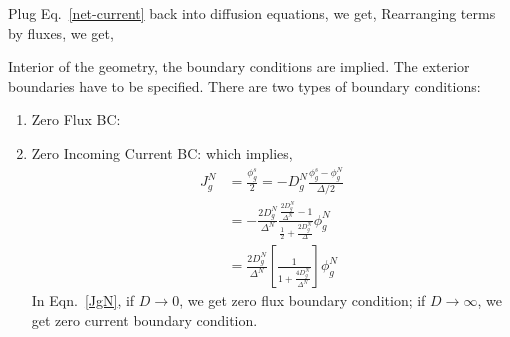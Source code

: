 \documentclass{school-22.211-notes}
\begin{document}
Plug Eq.~\ref{net-current} back into diffusion equations, we get, 
Rearranging terms by fluxes, we get, 

Interior of the geometry, the boundary conditions are implied. The exterior boundaries have to be specified. There are two types of boundary conditions:
\begin{enumerate}
\item Zero Flux BC: 
\item Zero Incoming Current BC:
which implies,
\begin{align}
  J_g^N &= \frac{\phi_g^s}{2} = -D_g^N \frac{\phi_g^s - \phi_g^N}{\Delta/2} \\
  &= - \frac{2 D_g^N}{\Delta^N} \frac{\frac{2D_g^N}{\Delta^N} - 1}{\frac{1}{2} + \frac{2D_g^N}{\Delta}} \phi_g^N \\
  &= \boxed{ \frac{2D_g^N}{\Delta^N} \left[ \frac{1}{1 + \frac{4 D_g^N}{\Delta^N}} \right] \phi_g^N } \label{JgN}
\end{align}
In Eqn.~\ref{JgN}, if $D \to 0$, we get zero flux boundary condition; if $D \to \infty$, we get zero current boundary condition. 
\end{enumerate}
\end{document}
